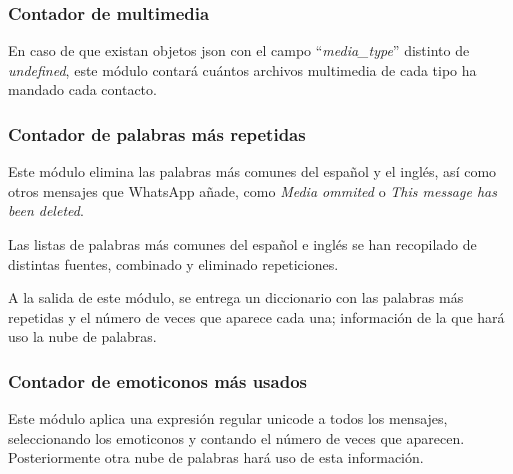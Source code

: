 \subsubsection{Contador de multimedia}

En caso de que existan objetos \acrshort{json} con el campo ``\textit{media\_type}'' distinto de \textit{undefined}, este módulo contará cuántos archivos multimedia de cada tipo ha mandado cada contacto.

\subsubsection{Contador de palabras más repetidas}

Este módulo elimina las palabras más comunes del español y el inglés, así como otros mensajes que WhatsApp añade, como \textit{Media ommited} o \textit{This message has been deleted}.

Las listas de palabras más comunes del español e inglés se han recopilado de distintas fuentes, combinado y eliminado repeticiones.

A la salida de este módulo, se entrega un diccionario con las palabras más repetidas y el número de veces que aparece cada una; información de la que hará uso la nube de palabras.






\subsubsection{Contador de emoticonos más usados}

Este módulo aplica una expresión regular unicode a todos los mensajes, seleccionando los emoticonos y contando el número de veces que aparecen. Posteriormente otra nube de palabras hará uso de esta información.

